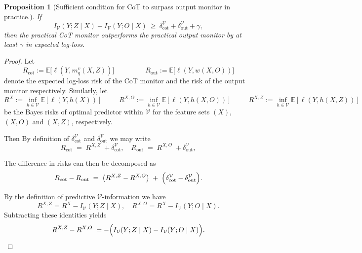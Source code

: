 \documentclass{article}
\theoremstyle{plain}
\newtheorem{proposition}[theorem]{Proposition}
\newcommand{\V}{\mathcal{V}}
\newcommand{\IV}{I_\mathcal{V}}
\begin{document}
\begin{proposition}[Sufficient condition for CoT to surpass output monitor in practice.]
If
\[
\IV(Y;Z\mid X)-\IV(Y;O\mid X)\ \ge\ \delta^{\V}_{\text{cot}}+\delta^{\V}_{\text{out}}+\gamma,
\]
then the practical CoT monitor outperforms the practical output monitor by at least $\gamma$ in expected log-loss.
\end{proposition}
\begin{proof}
Let
\[
R_{\mathrm{cot}}:=\mathbb{E}\big[\ell(Y,m_{q}^{v}(X,Z))\big]
\qquad \;\ \qquad
R_{\mathrm{out}}:=\mathbb{E}\big[\ell(Y,w(X,O))\big]
\]
denote the expected log-loss risk of the CoT monitor and the risk of the output monitor respectively. 
Similarly, let
\[
R^{X}:=\inf_{h\in \mathcal{V}}\mathbb{E}[\ell(Y,h(X))] \quad \;\ \quad
R^{X,O}:=\inf_{h\in \mathcal{V}}\mathbb{E}[\ell(Y,h(X,O))] \quad \;\ \quad
R^{X,Z}:=\inf_{h\in \mathcal{V}}\mathbb{E}[\ell(Y,h(X,Z))] 
\]
be the Bayes risks of optimal predictor within $\mathcal{V}$ for the feature sets $(X)$, $(X,O)$ and $(X,Z)$, respectively.

Then By definition of $\delta^{\mathcal{V}}_{\mathrm{cot}}$ and $\delta^{\mathcal{V}}_{\mathrm{out}}$ we may write
\[
R_{\mathrm{cot}}\;=\;R^{X,Z}\;+\delta^{\mathcal{V}}_{\mathrm{cot}},
\quad
R_{\mathrm{out}}\;=\;R^{X,O}\;+\delta^{\mathcal{V}}_{\mathrm{out}},
\]

The difference in risks can then be decomposed as
\begin{align}
\label{eq:theorem-v-information-1}    
R_{\mathrm{cot}}-R_{\mathrm{out}}
\;=\;\bigl(R^{X,Z}-R^{X,O}\bigr)
\;+\;
\Bigl(\delta^{\mathcal{V}}_{\mathrm{cot}}-\delta^{\mathcal{V}}_{\mathrm{out}}\Bigr).
\end{align}

By the definition of predictive $\mathcal{V}$-information we have
\[
R^{X,Z}=R^{X}-I_{\mathcal{V}}(Y;Z\mid X),
\quad
R^{X,O}=R^{X}-I_{\mathcal{V}}(Y;O\mid X).
\]
Subtracting these identities yields
\begin{align}
\label{eq:theorem-v-information-2}    
R^{X,Z}-R^{X,O}
\;=-\Bigl(I_{\mathcal{V}}(Y;Z\mid X)-I_{\mathcal{V}}(Y;O\mid X)\Bigr).
\end{align}


\end{proof}
\end{document}
